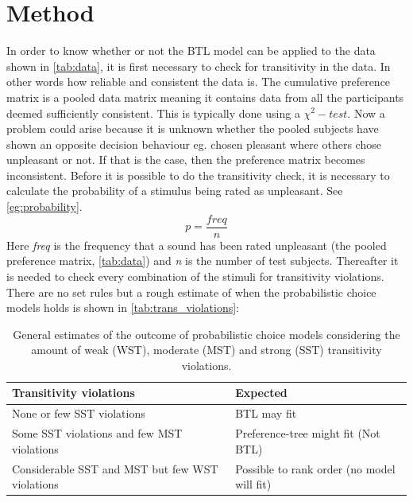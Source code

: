 \section*{Method}
\label{Method}
%
In order to know whether or not the BTL model can be applied to the data shown in \autoref{tab:data}, it is first necessary to check for transitivity in the data. In other words how reliable and consistent the data is. The cumulative preference matrix is a pooled data matrix meaning it contains data from all the participants deemed sufficiently consistent. This is typically done using a $\chi^{2}-test$. Now a problem could arise because it is unknown whether the pooled subjects have shown an opposite decision behaviour eg. chosen pleasant where others chose unpleasant or not. If that is the case, then the preference matrix becomes inconsistent. Before it is possible to do the transitivity check, it is necessary to calculate the probability of a stimulus being rated as unpleasant. See \autoref{eg:probability}.
%
\begin{equation}
p = \frac{freq}{n}
\end{equation}
\noindent
%
Here \textit{freq} is the frequency that a sound has been rated unpleasant (the pooled preference matrix, \autoref{tab:data}) and \textit{n} is the number of test subjects. Thereafter it is needed to check every combination of the stimuli for transitivity violations. There are no set rules but a rough estimate of when the probabilistic choice models holds is shown in \autoref{tab:trans_violations}:
%
\begin{table}[H]
\centering
\begin{tabular}{@{}ll@{}}
\toprule
Transitivity violations                                    & Expected                                      \\ \midrule
None or few SST violations                                 & BTL may fit                                   \\
Some SST violations and few MST violations                 & Preference-tree might fit (Not BTL)            \\
Considerable SST and MST but few WST violations & Possible to rank order (no model will fit) \\ \bottomrule
\end{tabular}
\caption{General estimates of the outcome of probabilistic choice models considering the amount of weak (WST), moderate (MST) and strong (SST) transitivity violations.}
\label{tab:trans_violations}
\end{table}
